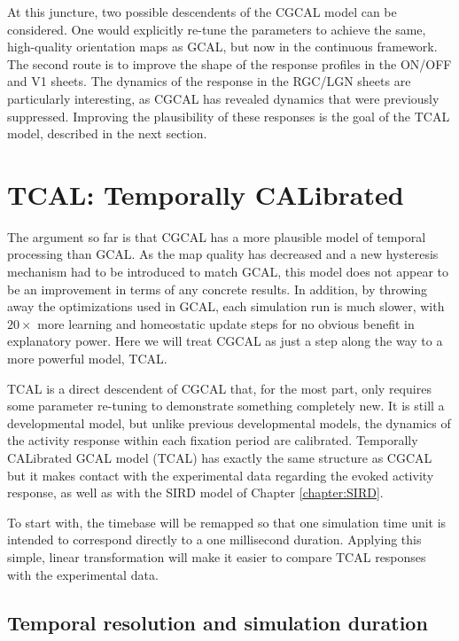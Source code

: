 \documentclass[phd,ianc,twoside]{infthesis}
\begin{document}
At this juncture, two possible descendents of the CGCAL model can be
considered. One would explicitly re-tune the parameters to achieve the
same, high-quality orientation maps as GCAL, but now in the continuous
framework. The second route is to improve the shape of the response
profiles in the ON/OFF and V1 sheets. The dynamics of the response in
the RGC/LGN sheets are particularly interesting, as CGCAL has revealed
dynamics that were previously suppressed. Improving the plausibility of
these responses is the goal of the TCAL model, described in the next
section.

\section{TCAL: Temporally CALibrated}
\label{section:TCAL}

The argument so far is that CGCAL has a more plausible model of temporal
processing than GCAL. As the map quality has decreased and a new
hysteresis mechanism had to be introduced to match GCAL, this model does
not appear to be an improvement in terms of any concrete results. In
addition, by throwing away the optimizations used in GCAL, each
simulation run is much slower, with $20\times$ more learning and
homeostatic update steps for no obvious benefit in explanatory power.
Here we will treat CGCAL as just a step along the way to a more
powerful model, TCAL.

TCAL is a direct descendent of CGCAL that, for the most part,
only requires some parameter re-tuning to demonstrate something
completely new. It is still a developmental model, but unlike previous
developmental models, the dynamics of the activity response within each
fixation period are calibrated. Temporally CALibrated GCAL model (TCAL)
has exactly the same structure as CGCAL but it makes contact with the
experimental data regarding the evoked activity response, as well as with
the SIRD model of Chapter \ref{chapter:SIRD}.

To start with, the timebase will be remapped so that one simulation time
unit is intended to correspond directly to a one millisecond
duration. Applying this simple, linear transformation will make it
easier to compare TCAL responses with the experimental data.


\subsection{Temporal resolution and simulation duration}
\end{document}
